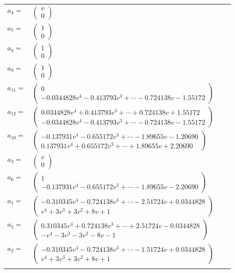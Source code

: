 \documentclass[1p]{elsarticle_modified}
\theoremstyle{definition}
\begin{document}
\begin{tabular}{m{7pt} m{180pt} m{7pt} m{180pt} }
\flushright $a_{4}=$&$\begin{pmatrix}v\\0\end{pmatrix}$ \\
\flushright $a_{7}=$&$\begin{pmatrix}1\\0\end{pmatrix}$ \\
\flushright $a_{8}=$&$\begin{pmatrix}1\\0\end{pmatrix}$ \\
\flushright $a_{9}=$&$\begin{pmatrix}1\\0\end{pmatrix}$ \\
\flushright $a_{11}=$&$\begin{pmatrix}0\\-0.0344828 v^{4}-0.413793 v^{3}+\cdots-0.724138 v-1.55172\end{pmatrix}$ \\
\flushright $a_{12}=$&$\begin{pmatrix}0.0344828 v^{4}+0.413793 v^{3}+\cdots+0.724138 v+1.55172\\-0.0344828 v^{4}-0.413793 v^{3}+\cdots-0.724138 v-1.55172\end{pmatrix}$ \\
\flushright $a_{10}=$&$\begin{pmatrix}-0.137931 v^{4}-0.655172 v^{3}+\cdots-1.89655 v-1.20690\\0.137931 v^{4}+0.655172 v^{3}+\cdots+1.89655 v+2.20690\end{pmatrix}$ \\
\flushright $a_{3}=$&$\begin{pmatrix}v\\0\end{pmatrix}$ \\
\flushright $a_{6}=$&$\begin{pmatrix}1\\-0.137931 v^{4}-0.655172 v^{3}+\cdots-1.89655 v-2.20690\end{pmatrix}$ \\
\flushright $a_{1}=$&$\begin{pmatrix}-0.310345 v^{4}-0.724138 v^{3}+\cdots-2.51724 v+0.0344828\\v^4+3 v^3+3 v^2+8 v+1\end{pmatrix}$ \\
\flushright $a_{5}=$&$\begin{pmatrix}0.310345 v^{4}+0.724138 v^{3}+\cdots+2.51724 v-0.0344828\\- v^4-3 v^3-3 v^2-8 v-1\end{pmatrix}$ \\
\flushright $a_{2}=$&$\begin{pmatrix}-0.310345 v^{4}-0.724138 v^{3}+\cdots-1.51724 v+0.0344828\\v^4+3 v^3+3 v^2+8 v+1\end{pmatrix}$\\&\end{tabular}
\end{document}
